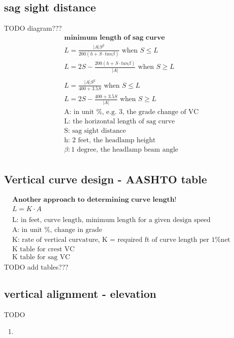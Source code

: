 \documentclass{article}
\begin{document}
  \subsection{sag sight distance}
  TODO diagram??? \\
  \begin{align*}
    & \textbf{minimum length of sag curve} \\
    & L = \frac{|A|S^2}{200(h + S \cdot tan \beta)}   \text{ when } S \leq L \\
    & L = 2S - \frac{200(h + S \cdot tan \beta)}{|A|} \text{ when } S \geq L \\
    \\
    & L = \frac{|A|S^2}{400 + 3.5S} \text{ when } S \leq L \\
    & L = 2S - \frac{400 + 3.5S}{|A|} \text{ when } S \geq L \\
    & \text{A: in unit \%, e.g. 3, the grade change of VC}\\
    & \text{L: the horizontal length of sag curve}\\
    & \text{S: sag sight distance} \\
    & \text{h: 2 feet, the headlamp height}\\
    & \beta: \text{1 degree, the headlamp beam angle}\\
  \end{align*}

  \subsection{Vertical curve design - AASHTO table}
  \begin{align*}
    & \textbf{Another approach to determining curve length! }\\
    &  L = K \cdot A \\
    \\
    & \text{L: in feet, curve length, minimum length for a given design speed }\\
    & \text{A: in unit \%, change in grade  }\\
    & \text{K: rate of vertical curvature, K = required ft of curve length per 1\% net change in grade }\\
    & \text{K table for crest VC }\\
    & \text{K table for sag VC }
  \end{align*}
  TODO add tables???

  \subsection{vertical alignment - elevation}
  TODO %
  \begin{enumerate}
    \item 
  \end{enumerate}
  \begin{align*}
    \\
  \end{align*}
\end{document}

